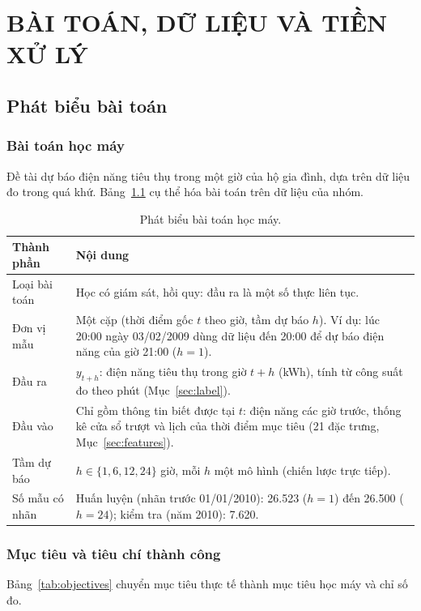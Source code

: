\chapter{BÀI TOÁN, DỮ LIỆU VÀ TIỀN XỬ LÝ}
\label{chap:data}

\section{Phát biểu bài toán}
\label{sec:problem}

\subsection{Bài toán học máy}
Đề tài dự báo điện năng tiêu thụ trong một giờ của hộ gia đình, dựa trên dữ liệu đo trong quá khứ. Bảng~\ref{tab:problem} cụ thể hóa bài toán trên dữ liệu của nhóm.

\begin{table}[htbp]
    \centering
    \caption{Phát biểu bài toán học máy.}
    \label{tab:problem}
    \small
    \begin{tabularx}{\textwidth}{|>{\raggedright\arraybackslash}p{3.0cm}|>{\raggedright\arraybackslash}X|}
        \hline
        \textbf{Thành phần} & \textbf{Nội dung} \\ \hline
        Loại bài toán & Học có giám sát, hồi quy: đầu ra là một số thực liên tục. \\ \hline
        Đơn vị mẫu & Một cặp (thời điểm gốc $t$ theo giờ, tầm dự báo $h$). Ví dụ: lúc 20:00 ngày 03/02/2009 dùng dữ liệu đến 20:00 để dự báo điện năng của giờ 21:00 ($h = 1$). \\ \hline
        Đầu ra & $y_{t+h}$: điện năng tiêu thụ trong giờ $t+h$ (kWh), tính từ công suất đo theo phút (Mục~\ref{sec:label}). \\ \hline
        Đầu vào & Chỉ gồm thông tin biết được tại $t$: điện năng các giờ trước, thống kê cửa sổ trượt và lịch của thời điểm mục tiêu (21 đặc trưng, Mục~\ref{sec:features}). \\ \hline
        Tầm dự báo & $h \in \{1, 6, 12, 24\}$ giờ, mỗi $h$ một mô hình (chiến lược trực tiếp). \\ \hline
        Số mẫu có nhãn & Huấn luyện (nhãn trước 01/01/2010): 26.523 ($h=1$) đến 26.500 ($h=24$); kiểm tra (năm 2010): 7.620. \\ \hline
    \end{tabularx}
\end{table}

\subsection{Mục tiêu và tiêu chí thành công}
Bảng~\ref{tab:objectives} chuyển mục tiêu thực tế thành mục tiêu học máy và chỉ số đo.

